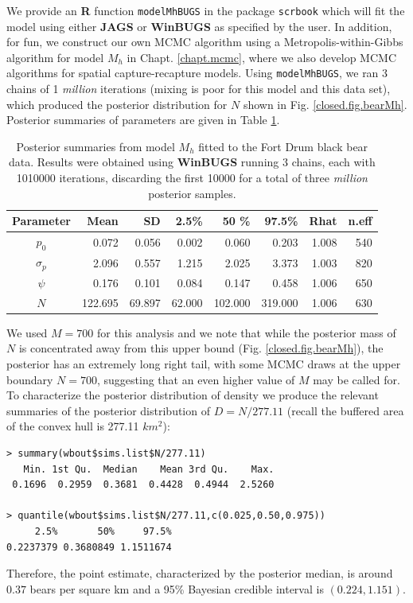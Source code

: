 We provide an {\bf R} function \mbox{\tt modelMhBUGS} in the package
\mbox{\tt scrbook} which will fit the model using either {\bf JAGS} or
{\bf WinBUGS} as specified by the user.  In addition, for fun, we
construct our own MCMC algorithm using a Metropolis-within-Gibbs
algorithm for model $M_{h}$ in Chapt. \ref{chapt.mcmc}, where we also
develop MCMC algorithms for spatial capture-recapture models.  Using
 \mbox{\tt modelMhBUGS}, we ran 3 chains of 1
{\it million} iterations (mixing is poor for this model and this data
set), which produced the posterior distribution for $N$ shown in
Fig. \ref{closed.fig.bearMh}. Posterior summaries of parameters are
given in Table \ref{closed.tab.bear}.


\begin{table}[ht]
  \caption{
    Posterior summaries from model $M_h$ fitted to the Fort Drum black
    bear data. Results 
    were obtained using {\bf WinBUGS}
    running 3 chains, each with 1010000 iterations, discarding the
    first 10000 for a total of three {\it million} posterior samples. 
}
\begin{tabular}{crrrrrrr} \hline \hline
 Parameter &  Mean   &  SD    &   2.5\% &  50 \%  &   97.5\% &Rhat& n.eff  \\ \hline
$p_0$      &   0.072 & 0.056  &   0.002 &  0.060  &   0.203  &1.008 &
540  \\ 
$\sigma_p$ &    2.096&  0.557 &   1.215 &  2.025  &   3.373  &1.003 &
820 \\ 
$\psi$     &    0.176&  0.101 &   0.084 &  0.147  &   0.458  & 1.006&
650 \\ 
$N$        & 122.695 &69.897  &  62.000 & 102.000 & 319.000  &1.006 &
630 \\ \hline
\end{tabular}
\label{closed.tab.bear}
\end{table}


We used $M=700$ for this analysis and we
note that  while the posterior mass of $N$ is concentrated away from this
upper bound (Fig. \ref{closed.fig.bearMh}), the posterior has an
extremely long right tail, with some MCMC draws at the upper
boundary $N=700$, suggesting that an even higher value of $M$ may be
called for.
To characterize the posterior distribution of density we produce the
relevant summaries of the posterior distribution of $D  = N/277.11$
(recall
the buffered area of the convex hull is 277.11 $km^2$):
{\small
\begin{verbatim}
> summary(wbout$sims.list$N/277.11)
   Min. 1st Qu.  Median    Mean 3rd Qu.    Max.
 0.1696  0.2959  0.3681  0.4428  0.4944  2.5260

> quantile(wbout$sims.list$N/277.11,c(0.025,0.50,0.975))
     2.5%       50%     97.5%
0.2237379 0.3680849 1.1511674
\end{verbatim}
}
{\flushleft Therefore}, the point estimate, characterized by the posterior median, is around
$0.37$ bears per square km and a 95\% Bayesian credible interval is
$(0.224, 1.151)$.


